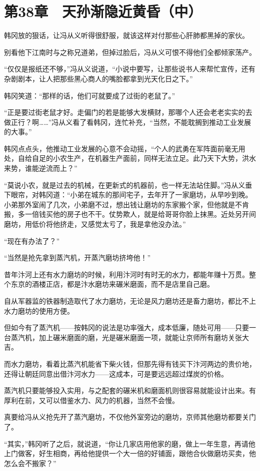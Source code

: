 \section{第38章　天孙渐隐近黄昏（中）}

韩冈放的狠话，让冯从义听得很舒服，就该这样对付那些心肝肺都黑掉的家伙。

别看他下江南时与之称兄道弟，但掉过脸后，冯从义可恨不得他们全都倾家荡产。

“仅仅是报纸还不够，”冯从义说道，“小说中要写，让那些说书人来帮忙宣传，还有杂剧剧本，让人把那些黑心商人的嘴脸都拿到光天化日之下。”

韩冈笑道：“那样的话，他们可就要成了过街的老鼠了。”

“正是要过街老鼠才好。走偏门的若是能够大发横财，那哪个人还会老老实实的去做正行？啊……”冯从义看了看韩冈，连忙补充，“当然，不能耽搁到推动工业发展的大事。”

韩冈点点头，他推动工业发展的心意不会动摇，“个人的武勇在军阵面前毫无用处，自给自足的小农生产，在机器生产面前，同样无法立足。此乃天下大势，洪水来势，谁能逆流而上？”

“莫说小农，就是过去的机械，在更新式的机器前，也一样无法站住脚。”冯从义垂下眼帘，对韩冈道：“小弟在城东的那间宅子，去年开了一家磨坊，从早吵到晚。小弟那外室闹了几次，小弟磨不过，想出钱让磨坊的东家搬个家，但他就是不肯搬，多一倍钱买他的房子也不干。仗势欺人，就是给哥哥你脸上抹黑。近处另开间磨坊，用低价将他挤走，又感觉太亏了，我是拿他没办法。”

“现在有办法了？”

“当然是抢先拿到蒸汽机，开蒸汽磨坊挤垮他！”

昔年汴河上还有水力磨坊的时候，利用汴河时有时无的水力，都能年赚十万贯。整个东京的酒楼正店，都是汴水磨坊来碾米磨面，而不是店里自己磨。

自从军器监的铁器制造取代了水力磨坊，无论是风力磨坊还是畜力磨坊，都比不上水力磨坊的使用方便。

但如今有了蒸汽机——按韩冈的说法是功率强大，成本低廉，随处可用——只要一台蒸汽机，加上碾米磨面的磨，光是碾米磨面一项，就能让京师所有磨坊关张大吉。

而水力磨坊，看着比蒸汽机能省下柴火钱，但那先得有钱买下汴河两边的贵价地，还得让朝廷同意出借汴河水力——这成本，可是要远远超过煤炭的价格。

蒸汽机只要能够投入实用，与之配套的碾米机和磨面机则很容易就能设计出来。有厚利在前，又可以借鉴水力、风力的机器，当然不会慢。

真要给冯从义抢先开了蒸汽磨坊，不仅他外室旁边的磨坊，京师其他磨坊都要关门了。

“其实，”韩冈听了之后，就说道，“你让几家店用他家的磨，做上一年生意，再请他上门做客，好生相商，再给他提供一个大一倍的好铺面，跟他合伙做磨坊买卖，他怎么会不搬家？”

